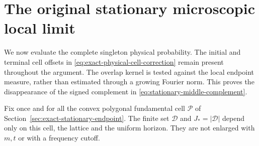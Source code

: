 \section{The original stationary microscopic local limit}
\label{sec:stationary-microscopic-LLT}
We now evaluate the complete singleton physical probability. The
initial and terminal cell offsets in
\eqref{eq:exact-physical-cell-correction} remain present throughout the
argument. The overlap kernel is tested against the local endpoint
measure, rather than estimated through a growing Fourier norm.
This proves the disappearance of the signed complement in
\eqref{eq:stationary-middle-complement}.

Fix once and for all the convex polygonal fundamental cell
$\mathcal P$ of Section~\ref{sec:exact-stationary-endpoint}. The finite
set $\mathcal D$ and $J_*=|\mathcal D|$ depend only on this cell, the
lattice and the uniform horizon. They are not enlarged with $m,t$ or
with a frequency cutoff.

